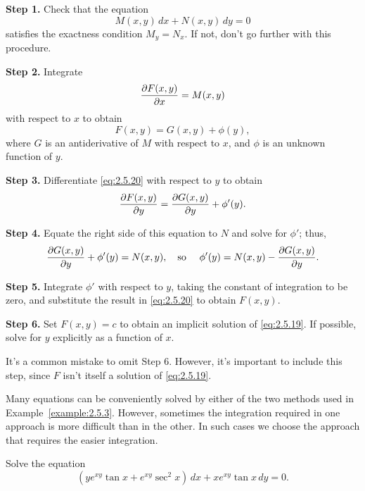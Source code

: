 \documentclass{ximera}
\begin{document}
\begin{procedure}
\item{\bf Step 1.} Check that the equation
\begin{equation} \label{eq:2.5.19}
 M(x,y)\,dx+N(x,y)\,dy=0
\end{equation}
satisfies the exactness condition  $M_y=N_x$. If not,
don't go further with this procedure.
\item{\bf Step 2.} Integrate
$$
{\partial F(x,y)\over\partial x}=M(x,y)
$$
with respect to $x$ to obtain
\begin{equation} \label{eq:2.5.20}
F(x,y)=G(x,y)+\phi(y),
\end{equation}
where $G$ is an antiderivative of $M$ with respect to $x$, and $\phi$
is an unknown function of $y$.
\item{\bf Step 3.} Differentiate \eqref{eq:2.5.20} with respect to
$y$  to obtain
$$
{\partial F(x,y)\over\partial y}={\partial G(x,y)\over\partial
y}+\phi'(y).
$$
\item{\bf Step 4.} Equate the right side of this equation to $N$ and solve
for $\phi'$;    thus,
$$
 {\partial G(x,y)\over\partial y}+\phi'(y)=N(x,y),\mbox{\quad  so \quad }
\phi'(y)=N(x,y)-{\partial G(x,y)\over\partial y}.
$$
\item{\bf Step 5.} Integrate $\phi'$ with respect to $y$, taking the
constant of integration to be zero, and substitute the result in
\eqref{eq:2.5.20} to obtain $F(x,y)$.
\item{\bf Step 6.} Set $F(x,y)=c$ to obtain an implicit solution of
\eqref{eq:2.5.19}. If possible, solve for $y$ explicitly as a
function of $x$.
\end{procedure}



It's a common mistake to omit Step 6. However, it's important to
include this step, since $F$ isn't  itself a solution of
\eqref{eq:2.5.19}.

Many equations can be conveniently solved by either of the two methods
used in Example~\ref{example:2.5.3}. However, sometimes the integration
required in one approach is  more difficult than in the
other. In such cases we choose the approach that requires the easier
integration.

\begin{example}\label{example:2.5.4} \rm
 Solve the equation
\begin{equation}  \label{eq:2.5.21}
(ye^{xy} \tan x+e^{xy} \sec^2x)\,dx+xe^{xy} \tan x\,dy=0.
\end{equation}
\end{example}
\end{document}
